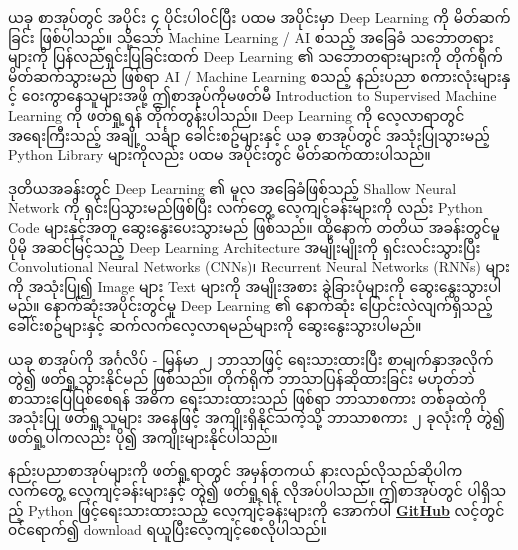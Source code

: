 ယခု စာအုပ်တွင် အပိုင်း ၄ ပိုင်းပါ၀င်ပြီး ပထမ အပိုင်းမှာ Deep Learning ကို မိတ်ဆက်ခြင်း ဖြစ်ပါသည်။ သို့သော် Machine Learning / AI စသည့် အခြေခံ သဘောတရားများကို ပြန်လည်ရှင်းပြခြင်းထက်  Deep Learning ၏ သဘောတရားများကို တိုက်ရိုက်မိတ်ဆက်သွားမည် ဖြစ်ရာ AI / Machine Learning စသည့် နည်းပညာ စကားလုံးများနှင့် ၀ေးကွာနေသူများအဖို့  ဤစာအုပ်ကိုမဖတ်မီ  Introduction to Supervised Machine Learning ကို ဖတ်ရှု့ရန် တိုက်တွန်းပါသည်။ Deep Learning ကို လေ့လာရာတွင် အရေးကြီးသည့် အချို့ သင်္ချာ ခေါင်းစဥ်များနှင့် ယခု စာအုပ်တွင် အသုံးပြုသွားမည့်  Python Library များကိုလည်း ပထမ အပိုင်းတွင် မိတ်ဆက်ထားပါသည်။ 

ဒုတိယအခန်းတွင်  Deep Learning ၏ မူလ အခြေခံဖြစ်သည့် Shallow Neural Network ကို ရှင်းပြသွားမည်ဖြစ်ပြီး လက်တွေ့ လေ့ကျင့်ခန်းများကို လည်း Python Code များနှင့်အတူ ဆွေးနွေးပေးသွားမည် ဖြစ်သည်။ ထို့နောက် တတိယ အခန်းတွင်မူ ပိုမို အဆင်မြင့်သည့် Deep Learning Architecture အမျိုးမျိုးကို ရှင်းလင်းသွားပြီး Convolutional Neural Networks (CNNs)၊ Recurrent Neural Networks (RNNs) များကို အသုံးပြု၍ Image များ  Text များကို အမျိုးအစား ခွဲခြားပုံများကို ဆွေးနွေးသွားပါမည်။ နောက်ဆုံးအပိုင်းတွင်မူ Deep Learning ၏ နောက်ဆုံး ပြောင်းလဲလျက်ရှိသည့် ခေါင်းစဥ်များနှင့် ဆက်လက်လေ့လာရမည်များကို ဆွေးနွေးသွားပါမည်။ 

ယခု စာအုပ်ကို အင်္ဂလိပ် - မြန်မာ ၂ ဘာသာဖြင့် ရေးသားထားပြီး စာမျက်နှာအလိုက် တွဲ၍ ဖတ်ရှု့သွားနိုင်မည် ဖြစ်သည်။ တိုက်ရိုက် ဘာသာပြန်ဆိုထားခြင်း မဟုတ်ဘဲ စာသားပြေပြစ်စေရန် အဓိက ရေးသားထားသည် ဖြစ်ရာ ဘာသာစကား တစ်ခုထဲကို အသုံးပြု ဖတ်ရှု့သူများ အနေဖြင့် အကျိုးရှိနိုင်သကဲ့သို့ ဘာသာစကား ၂ ခုလုံးကို တွဲ၍ ဖတ်ရှု့ပါကလည်း ပို၍ အကျိုးများနိုင်ပါသည်။ 

နည်းပညာစာအုပ်များကို ဖတ်ရှု့ရာတွင် အမှန်တကယ် နားလည်လိုသည်ဆိုပါက လက်တွေ့ လေ့ကျင့်ခန်းများနှင့် တွဲ၍ ဖတ်ရှု့ရန် လိုအပ်ပါသည်။ ဤစာအုပ်တွင် ပါရှိသည့် Python ဖြင့်ရေးသားထားသည့် လေ့ကျင့်ခန်းများကို အောက်ပါ \href{https://github.com/myothida/Intro-To-Supervised-Machine-Learning.git}{\textbf{GitHub}} လင့်တွင် ၀င်ရောက်၍ download ရယူပြီးလေ့ကျင့်စေလိုပါသည်။ 